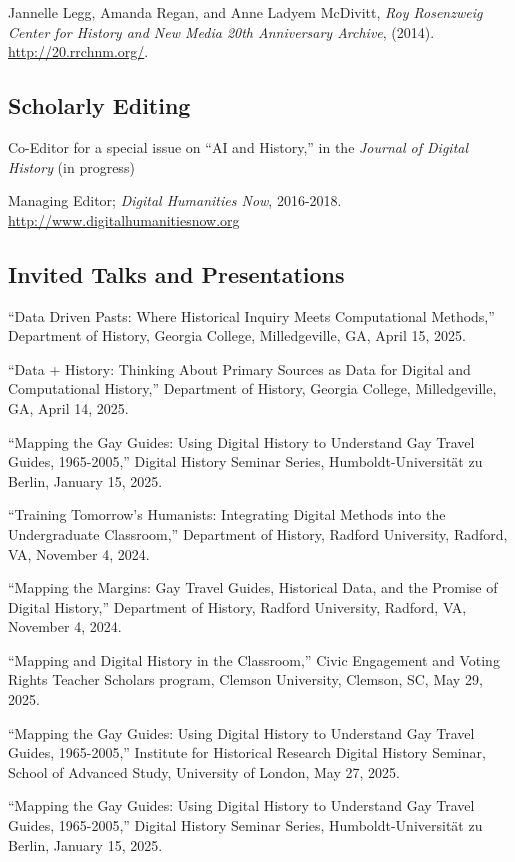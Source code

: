\documentclass[11pt]{article}
\begin{document}
Jannelle Legg, Amanda Regan, and Anne Ladyem McDivitt, \emph{Roy Rosenzweig Center for History and New Media 20th Anniversary Archive}, (2014). \url{http://20.rrchnm.org/}.

\subsection{Scholarly Editing}
Co-Editor for a special issue on “AI and History,” in the \emph{Journal of Digital History} (in progress)

Managing Editor; \emph{Digital Humanities Now}, 2016-2018. \url{http://www.digitalhumanitiesnow.org}

\subsection{Invited Talks and Presentations}

``Data Driven Pasts: Where Historical Inquiry Meets Computational Methods,'' Department of History, Georgia College, Milledgeville, GA, April 15, 2025.

``Data + History: Thinking About Primary Sources as Data for Digital and Computational History,'' Department of History, Georgia College, Milledgeville, GA, April 14, 2025.

``Mapping the Gay Guides: Using Digital History to Understand Gay Travel Guides, 1965-2005,'' Digital History Seminar Series, Humboldt-Universität zu Berlin, January 15, 2025.

``Training Tomorrow's Humanists: Integrating Digital Methods into the Undergraduate Classroom,'' Department of History, Radford University, Radford, VA, November 4, 2024. 

``Mapping the Margins: Gay Travel Guides, Historical Data, and the Promise of Digital History,'' Department of History, Radford University, Radford, VA, November 4, 2024. 

``Mapping and Digital History in the Classroom,'' Civic Engagement and Voting Rights Teacher Scholars program, Clemson University, Clemson, SC, May 29, 2025.

``Mapping the Gay Guides: Using Digital History to Understand Gay Travel Guides, 1965-2005,'' Institute for Historical Research Digital History Seminar, School of Advanced Study, University of London, May 27, 2025.

``Mapping the Gay Guides: Using Digital History to Understand Gay Travel Guides, 1965-2005,'' Digital History Seminar Series, Humboldt-Universität zu Berlin, January 15, 2025.
\end{document}
